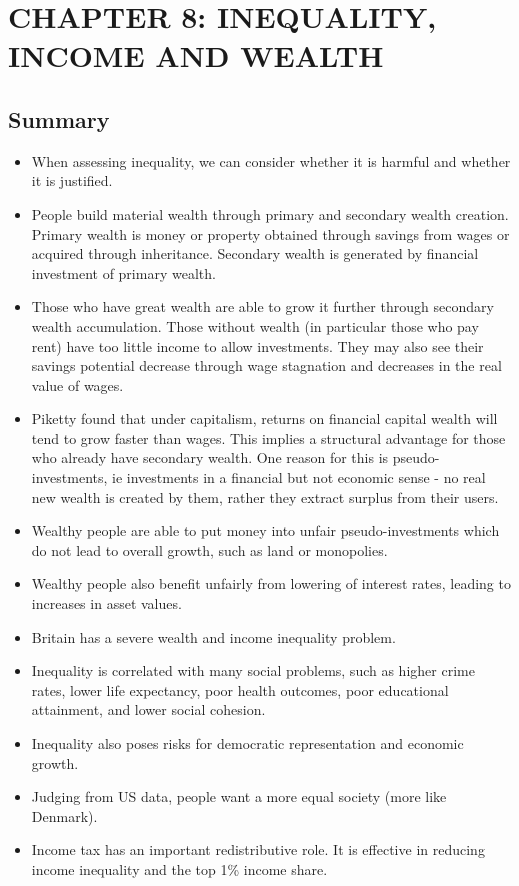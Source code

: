 \documentclass[]{tufte-handout}
\providecommand{\tightlist}{%
  \setlength{\itemsep}{0pt}\setlength{\parskip}{0pt}}
\begin{document}
\newpage

\hypertarget{chapter-8-inequality-income-and-wealth}{%
\section{CHAPTER 8: INEQUALITY, INCOME AND
WEALTH}\label{chapter-8-inequality-income-and-wealth}}

\hypertarget{summary-2}{%
\subsection{Summary}\label{summary-2}}

\begin{itemize}
\tightlist
\item
  When assessing inequality, we can consider whether it is harmful and
  whether it is justified.
\item
  People build material wealth through primary and secondary wealth
  creation. Primary wealth is money or property obtained through savings
  from wages or acquired through inheritance. Secondary wealth is
  generated by financial investment of primary wealth.
\item
  Those who have great wealth are able to grow it further through
  secondary wealth accumulation. Those without wealth (in particular
  those who pay rent) have too little income to allow investments. They
  may also see their savings potential decrease through wage stagnation
  and decreases in the real value of wages.
\item
  Piketty found that under capitalism, returns on financial capital
  wealth will tend to grow faster than wages. This implies a structural
  advantage for those who already have secondary wealth. One reason for
  this is pseudo-investments, ie investments in a financial but not
  economic sense - no real new wealth is created by them, rather they
  extract surplus from their users.
\item
  Wealthy people are able to put money into unfair pseudo-investments
  which do not lead to overall growth, such as land or monopolies.
\item
  Wealthy people also benefit unfairly from lowering of interest rates,
  leading to increases in asset values.
\item
  Britain has a severe wealth and income inequality problem.
\item
  Inequality is correlated with many social problems, such as higher
  crime rates, lower life expectancy, poor health outcomes, poor
  educational attainment, and lower social cohesion.
\item
  Inequality also poses risks for democratic representation and economic
  growth.
\item
  Judging from US data, people want a more equal society (more like
  Denmark).
\item
  Income tax has an important redistributive role. It is effective in
  reducing income inequality and the top 1\% income share.
\end{itemize}
\end{document}
